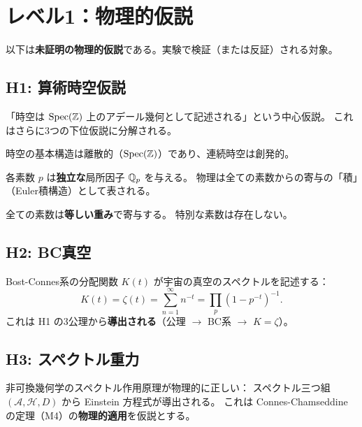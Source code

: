 \section{レベル1：物理的仮説}
\label{sec:17.2}

以下は\textbf{未証明の物理的仮説}である。実験で検証（または反証）される対象。

\subsection{H1: 算術時空仮説}

「時空は $\operatorname{Spec}(\mathbb{Z})$ 上のアデール幾何として記述される」という中心仮説。
これはさらに3つの下位仮説に分解される。

\begin{hypbox}
\begin{description}[style=nextline, leftmargin=2cm]
  \item[H1a（離散性）] 時空の基本構造は離散的（$\operatorname{Spec}(\mathbb{Z})$）であり、連続時空は創発的。
  \item[H1b（素数独立）] 各素数 $p$ は\textbf{独立な}局所因子 $\mathbb{Q}_p$ を与える。
        物理は全ての素数からの寄与の「積」（Euler積構造）として表される。
  \item[H1c（民主主義）] 全ての素数は\textbf{等しい重み}で寄与する。
        特別な素数は存在しない。
\end{description}
\end{hypbox}

\subsection{H2: BC真空}

\begin{hypbox}[H2: BC真空（$K = \zeta$）]
Bost-Connes系の分配関数 $K(t)$ が宇宙の真空のスペクトルを記述する：
\[
  K(t) = \zeta(t) = \sum_{n=1}^{\infty} n^{-t} = \prod_p (1 - p^{-t})^{-1}.
\]
これは H1 の3公理から\textbf{導出される}（公理 $\to$ BC系 $\to$ $K = \zeta$）。
\end{hypbox}

\subsection{H3: スペクトル重力}

\begin{hypbox}[H3: スペクトル重力]
非可換幾何学のスペクトル作用原理が物理的に正しい：
スペクトル三つ組 $(\mathcal{A}, \mathcal{H}, D)$ から Einstein 方程式が導出される。
これは Connes-Chamseddine の定理（M4）の\textbf{物理的適用}を仮説とする。
\end{hypbox}

